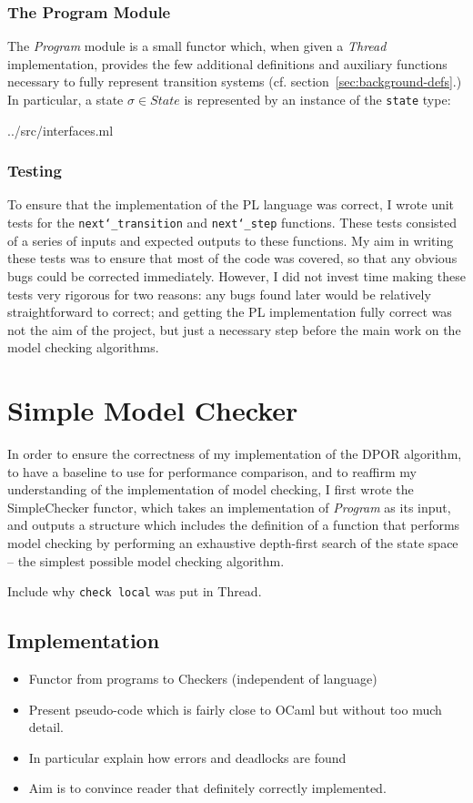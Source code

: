 \documentclass[12pt,a4paper,twoside,openright]{report}
\begin{document}
\subsubsection{The Program Module}
The \emph{Program} module is a small functor which,
when given a \emph{Thread} implementation, provides 
the few additional definitions and auxiliary
functions necessary to fully represent
transition systems (cf. section~\ref{sec:background-defs}.)
In particular, a state $\sigma \in \textit{State}$ is
represented by an instance of the \texttt{state} type:

	{../src/interfaces.ml}

\subsubsection{Testing}
To ensure that the implementation of the PL
language was correct, I wrote unit tests for
the \texttt{next\char`_transition} and
\texttt{next\char`_step} functions. These tests
consisted of a series of inputs and expected outputs
to these functions. My aim in writing these tests
was to ensure that most of the code was covered,
so that any obvious bugs could be corrected
immediately. However, I did not invest time
making these tests very rigorous for two reasons:
any bugs found later would be relatively straightforward
to correct; and getting the PL implementation
fully correct was not the aim of the project, but
just a necessary step before the main work on the
model checking algorithms.


\section{Simple Model Checker}

In order to ensure the correctness of my implementation
of the DPOR algorithm, to have a baseline to use
for performance comparison, and to reaffirm my understanding
of the implementation of model checking, I first wrote the
SimpleChecker functor, which takes an implementation of
\emph{Program} as its input, and outputs a structure
which includes the definition of
a function that performs model checking by performing
an exhaustive depth-first search of the state space --
the simplest possible model checking algorithm.

Include why \texttt{check local} was put in Thread.

\subsection{Implementation}
\begin{itemize}
	\item Functor from programs to Checkers (independent of language)
	\item Present pseudo-code which is fairly close to OCaml but
		without too much detail.
	\item In particular explain how errors and deadlocks are found
	\item Aim is to convince reader that definitely correctly
		implemented.
\end{itemize}
\end{document}

